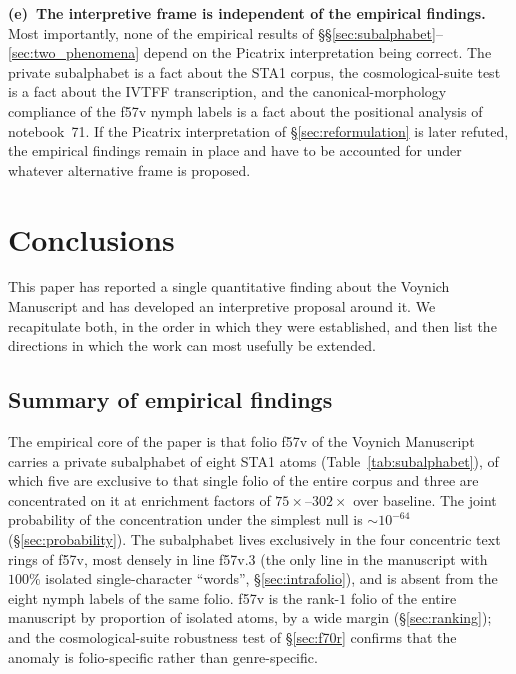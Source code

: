 \noindent\textbf{(e)~The interpretive frame is independent of the
empirical findings.} Most importantly, none of the empirical results
of \S\S\ref{sec:subalphabet}--\ref{sec:two_phenomena} depend on the
Picatrix interpretation being correct. The private subalphabet is a
fact about the STA1 corpus, the cosmological-suite test is a fact
about the IVTFF transcription, and the canonical-morphology compliance
of the f57v nymph labels is a fact about the positional analysis of
notebook~71. If the Picatrix interpretation of \S\ref{sec:reformulation}
is later refuted, the empirical findings remain in place and have to
be accounted for under whatever alternative frame is proposed.


\section{Conclusions}
\label{sec:conclusions}

This paper has reported a single quantitative finding about the Voynich
Manuscript and has developed an interpretive proposal around it. We
recapitulate both, in the order in which they were established, and
then list the directions in which the work can most usefully be
extended.

\subsection{Summary of empirical findings}
\label{sec:summary_empirical}

The empirical core of the paper is that folio f57v of the Voynich
Manuscript carries a private subalphabet of eight STA1 atoms
(Table~\ref{tab:subalphabet}), of which five are exclusive to that
single folio of the entire corpus and three are concentrated on it
at enrichment factors of $75\times$--$302\times$ over baseline. The
joint probability of the concentration under the simplest null is
$\sim 10^{-64}$ (\S\ref{sec:probability}). The subalphabet lives
exclusively in the four concentric text rings of f57v, most densely
in line f57v.3 (the only line in the manuscript with $100\%$
isolated single-character ``words'', \S\ref{sec:intrafolio}), and is
absent from the eight nymph labels of the same folio. f57v is the
rank-$1$ folio of the entire manuscript by proportion of isolated
atoms, by a wide margin (\S\ref{sec:ranking}); and the
cosmological-suite robustness test of \S\ref{sec:f70r} confirms that
the anomaly is folio-specific rather than genre-specific.

